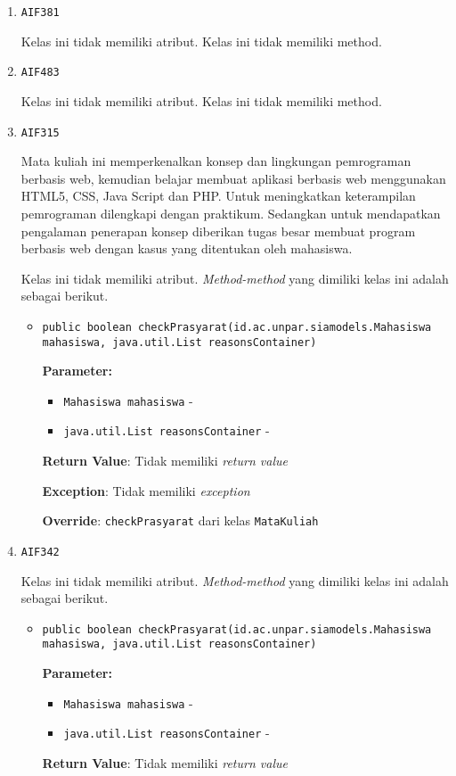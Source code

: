 \documentclass{article}
\begin{document}
\begin{enumerate}
\begin{itemize}
\end{itemize}
\item \texttt{AIF381}



Kelas ini tidak memiliki atribut. Kelas ini tidak memiliki method. \item \texttt{AIF483}



Kelas ini tidak memiliki atribut. Kelas ini tidak memiliki method. \item \texttt{AIF315}

Mata kuliah ini memperkenalkan konsep dan lingkungan pemrograman berbasis web,
 kemudian belajar membuat aplikasi berbasis web menggunakan HTML5, CSS, Java Script 
 dan PHP. Untuk meningkatkan keterampilan pemrograman dilengkapi dengan praktikum. 
 Sedangkan untuk mendapatkan pengalaman penerapan konsep diberikan tugas besar membuat 
 program berbasis web dengan kasus yang ditentukan oleh mahasiswa.

Kelas ini tidak memiliki atribut. \textit{Method-method} yang dimiliki kelas ini adalah sebagai berikut.
\begin{itemize}
\item \texttt{public boolean checkPrasyarat(id.ac.unpar.siamodels.Mahasiswa mahasiswa, java.util.List reasonsContainer)}

\textbf{Parameter:}
\begin{itemize}
\item \texttt{Mahasiswa mahasiswa} - 
\item \texttt{java.util.List reasonsContainer} - 
\end{itemize}
\textbf{Return Value}: Tidak memiliki \textit{return value}

\textbf{Exception}: Tidak memiliki \textit{exception}

\textbf{Override}: \texttt{checkPrasyarat} dari kelas \texttt{MataKuliah}

\end{itemize}
\item \texttt{AIF342}



Kelas ini tidak memiliki atribut. \textit{Method-method} yang dimiliki kelas ini adalah sebagai berikut.
\begin{itemize}
\item \texttt{public boolean checkPrasyarat(id.ac.unpar.siamodels.Mahasiswa mahasiswa, java.util.List reasonsContainer)}

\textbf{Parameter:}
\begin{itemize}
\item \texttt{Mahasiswa mahasiswa} - 
\item \texttt{java.util.List reasonsContainer} - 
\end{itemize}
\textbf{Return Value}: Tidak memiliki \textit{return value}


\end{itemize}
\end{enumerate}
\end{document}
